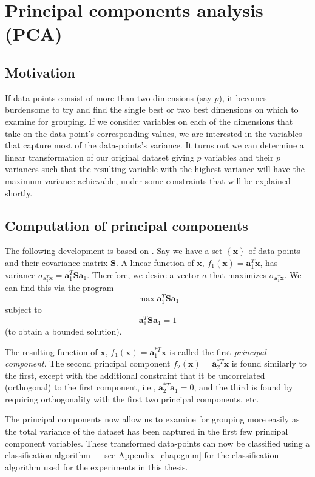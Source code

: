\chapter{Principal components analysis (PCA)\label{chap:pca}}

\section{Motivation}

If data-points consist of more than two dimensions (say $p$), it becomes
burdensome to try and find the single best or two best dimensions on which to
examine for grouping. If we consider variables on each of the dimensions that
take on the data-point's corresponding values, we are interested in the
variables that capture most of the data-points's variance. It turns out we can
determine a linear transformation of our original dataset giving $p$ variables
and their $p$ variances such that the resulting variable with the highest
variance will have the maximum variance achievable, under some constraints that
will be explained shortly. 

\section{Computation of principal components}

The following development is based on \cite{jolliffe2002principal}. Say we have
a set $\left\{ \boldsymbol{x} \right\}$ of data-points and their covariance
matrix $\boldsymbol{S}$. A linear function of $\boldsymbol{x}$,
$f_1(\boldsymbol{x})=\boldsymbol{a}_{1}^{T}\boldsymbol{x}$, has variance
$\sigma_{\boldsymbol{a}_{1}^{T}\boldsymbol{x}}=\boldsymbol{a}_{1}^{T}\boldsymbol{S}\boldsymbol{a}_{1}$.
Therefore, we desire a vector $a$ that maximizes
$\sigma_{\boldsymbol{a}_{1}^{T}\boldsymbol{x}}$. We can find this via the program
\[
        \max \boldsymbol{a}_{1}^{T}\boldsymbol{S}\boldsymbol{a}_{1}
\]
subject to
\[
    \boldsymbol{a}_{1}^{T}\boldsymbol{S}\boldsymbol{a}_{1}=1
\]
(to obtain a bounded solution).

The resulting function of $\boldsymbol{x}$,
$f_1(\boldsymbol{x})=\boldsymbol{a}_{1}^{\ast T}\boldsymbol{x}$ is called the first
\textit{principal component}. The second principal component
$f_2(\boldsymbol{x})=\boldsymbol{a}_{2}^{\ast T}\boldsymbol{x}$ is found similarly
to the first, except with the additional constraint that it be uncorrelated
(orthogonal) to the first component, i.e.,
$\boldsymbol{a}_{2}^{\ast T}\boldsymbol{a}_{1}=0$, and the third is found by
requiring orthogonality with the first two principal components, etc.

The principal components now allow us to examine for grouping more easily as the
total variance of the dataset has been captured in the first few principal component
variables. These transformed data-points can now be classified using a
classification algorithm --- see Appendix~\ref{chap:gmm} for the classification
algorithm used for the experiments in this thesis.
